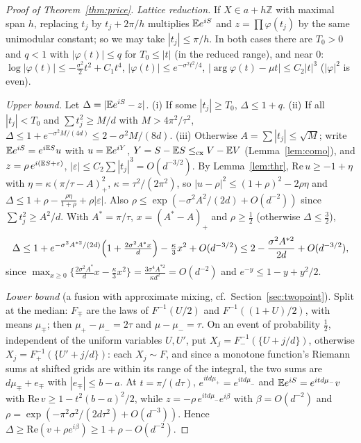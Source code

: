 \documentclass[11pt]{amsart}
\theoremstyle{definition}\newtheorem{definition}[theorem]{Definition}\theoremstyle{remark}\newtheorem{remark}[theorem]{Remark}
\begin{document}
\begin{proof}[Proof of Theorem~\ref{thm:price}]\emph{Lattice reduction.} If $X\in a+h\mathbb Z$ with maximal span $h$, replacing $t_j$ by $t_j+2\pi/h$ multiplies $\mathbb E e^{iS}$ and $z=\prod\varphi(t_j)$
by the same unimodular constant; so we may take $|t_j|\le\pi/h$. In both cases there are $T_0>0$ and $q<1$ with $|\varphi(t)|\le q$ for $T_0\le|t|$ (in the reduced
range), and near $0$: $\log|\varphi(t)|\le-\frac{\sigma^2}2t^2+C_1t^4$, $|\varphi(t)|\le e^{-\sigma^2t^2/4}$, $|\arg\varphi(t)-\mu t|\le C_2|t|^3$ ($|\varphi|^2$ is even).

\emph{Upper bound.} Let $\Delta=|\mathbb E e^{iS}-z|$. (i) If some $|t_j|\ge T_0$, $\Delta\le1+q$. (ii) If all $|t_j|<T_0$ and $\sum t_j^2\ge M/d$ with $M>4\pi^2/\tau^2$,
$\Delta\le1+e^{-\sigma^2M/(4d)}\le2-\sigma^2M/(8d)$. (iii) Otherwise $A=\sum|t_j|\le\sqrt M$; write $\mathbb E e^{iS}=e^{i\mathbb E S}u$ with $u=\mathbb E e^{iY}$, $Y=S-\mathbb E S\le_{\mathrm{cx}} V-\mathbb E V$
(Lemma~\ref{lem:como}), and $z=\rho\,e^{i(\mathbb E S+\varepsilon)}$, $|\varepsilon|\le C_2\sum|t_j|^3=O(d^{-3/2})$. By Lemma~\ref{lem:thr}, $\mathrm{Re}\,u\ge-1+\eta$ with
$\eta=\kappa(\pi/\tau-A)_+^2$, $\kappa=\tau^2/(2\pi^2)$, so $|u-\rho|^2\le(1+\rho)^2-2\rho\eta$ and $\Delta\le1+\rho-\frac{\rho\eta}{1+\rho}+\rho|\varepsilon|$. Also
$\rho\le\exp(-\sigma^2A^2/(2d)+O(d^{-2}))$ since $\sum t_j^2\ge A^2/d$. With $A^*=\pi/\tau$, $x=(A^*-A)_+$ and $\rho\ge\frac12$ (otherwise $\Delta\le\frac32$),
\[\Delta\le1+e^{-\sigma^2A^{*2}/(2d)}\Bigl(1+\tfrac{2\sigma^2A^*x}d\Bigr)-\tfrac\kappa3x^2+O(d^{-3/2})\le2-\frac{\sigma^2A^{*2}}{2d}+O(d^{-3/2}),\]
since $\max_{x\ge0}\{\frac{2\sigma^2A^*}dx-\frac\kappa3x^2\}=\frac{3\sigma^4A^{*2}}{\kappa d^2}=O(d^{-2})$ and $e^{-y}\le1-y+y^2/2$.

\emph{Lower bound} (a fusion with approximate mixing, cf.\ Section~\ref{sec:twopoint}). Split at the median: $F_\mp$ are the laws of $F^{-1}(U/2)$ and $F^{-1}((1+U)/2)$,
with means $\mu_\mp$; then $\mu_+-\mu_-=2\tau$ and $\mu-\mu_-=\tau$. On an event of probability $\frac12$, independent of the uniform variables $U,U'$, put $X_j=F_-^{-1}(\{U+j/d\})$, otherwise
$X_j=F_+^{-1}(\{U'+j/d\})$: each $X_j\sim F$, and since a monotone function's Riemann sums at shifted grids are within its range of the integral, the two
sums are $d\mu_\mp+e_\mp$ with $|e_\mp|\le b-a$. At $t=\pi/(d\tau)$, $e^{itd\mu_+}=e^{itd\mu_-}$ and $\mathbb E e^{iS}=e^{itd\mu_-}v$ with $\mathrm{Re}\,v\ge1-t^2(b-a)^2/2$, while
$z=-\rho\,e^{itd\mu_-}e^{i\beta}$ with $\beta=O(d^{-2})$ and $\rho=\exp(-\pi^2\sigma^2/(2d\tau^2)+O(d^{-3}))$. Hence $\Delta\ge\mathrm{Re}(v+\rho e^{i\beta})\ge1+\rho-O(d^{-2})$.
\end{proof}
\end{document}
